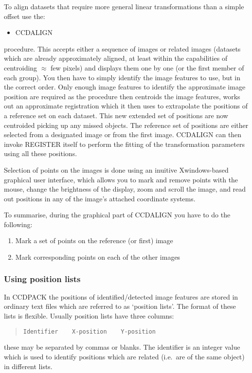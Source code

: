 \documentclass[twoside,11pt]{article}
\newcommand{\htmlref}[2]{#1}
\newcommand{\xlabel}[1]{}
\renewcommand{\_}{\texttt{\symbol{95}}}
\newenvironment{myquote}{\begin{quote}\begin{small}}{\end{small}\end{quote}}
\newcommand{\routine}[1]{{\sc #1}}
\newcommand{\xroutine}[1]{\htmlref{{\sc #1}}{#1}}
\begin{document}
To align datasets that require more general linear transformations
than a simple offset
use the:
\begin{itemize}
\item \xroutine{CCDALIGN}
\end{itemize}
procedure. This accepts either a sequence of images or related images
(datasets which are already approximately aligned, at least within the
capabilities of centroiding $\approx$ few pixels) and displays them one
by one (or the first member of each group). You then have to simply
identify the image features to use, but in the correct order. Only
enough image features to identify the approximate image position are
required as the  procedure then centroids the image features, works out
an approximate registration which it then uses to extrapolate the
positions of a reference set on each dataset. This new extended set of
positions are now centroided picking up any missed objects. The
reference set of positions are either selected from a designated image or
from the first image.
\routine{CCDALIGN} can then invoke \routine{REGISTER} itself to
perform the fitting of the transformation parameters using all these
positions.

Selection of points on the images is done using an inuitive Xwindows-based
graphical user interface, which allows you to mark and remove 
points with the mouse, change the brightness of the display,
zoom and scroll the image, and read out positions in any
of the image's attached coordinate systems.

To summarise, during the graphical part of \routine{CCDALIGN} 
you have to do the following:
\begin{enumerate}
\item Mark a set of points on the reference (or first) image
\item Mark corresponding points on each of the other images
\end{enumerate}



\subsubsection{\xlabel{usinglistsofpositions}Using position lists
               \label{using_position_lists}}

In CCDPACK the positions of identified/detected image features are
stored in ordinary text files which are referred to as `position lists'.
The format of these lists is flexible. Usually position lists have three
columns:
\begin{myquote}
\begin{verbatim}
Identifier    X-position    Y-position
\end{verbatim}
\end{myquote}
these may be separated by commas or blanks. The identifier is an
integer value which is used to identify positions which are related
(i.e.\ are of the same object) in different lists.
\end{document}
